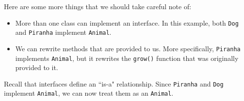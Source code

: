 Here are some more things that we should take careful note of: \begin{itemize}
    \item More than one class can implement an interface. In this example, both \verb!Dog! and \verb!Piranha! implement \verb!Animal!.
    \item We can rewrite methods that are provided to us. More specifically, \verb!Piranha! implements \verb!Animal!, but it rewrites the \verb!grow()! function that was originally provided to it.
\end{itemize}

Recall that interfaces define an ``is-a" relationship. Since \verb!Piranha! and \verb!Dog! implement \verb!Animal!, we can now treat them as an \verb!Animal!.
